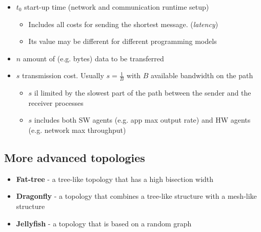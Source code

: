 \begin{itemize}
   \item $t_0$ start-up time (network and communication runtime setup)
   \begin{itemize}
      \item Includes all costs for sending the shortest message. (\textit{latency})
      \item Its value may be different for different programming models
   \end{itemize}
   \item $n$ amount of (e.g. bytes) data to be transferred
   \item $s$ transmission cost. Usually $s = \frac{1}{B}$ with $B$ available bandwidth on the path
   \begin{itemize}
      \item $s$ il limited by the slowest part of the path between the sender and the receiver processes
      \item $s$ includes both SW agents (e.g. app max output rate) and HW agents (e.g. network max throughput)
   \end{itemize}
\end{itemize}

\subsection{More advanced topologies}
\begin{itemize}
   \item \textbf{Fat-tree} - a tree-like topology that has a high bisection width
   \item \textbf{Dragonfly} - a topology that combines a tree-like structure with a mesh-like structure
   \item \textbf{Jellyfish} - a topology that is based on a random graph
\end{itemize}

\newpage

